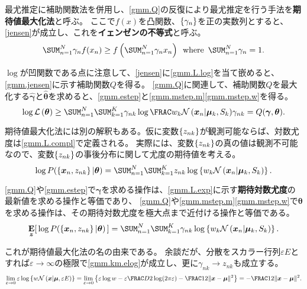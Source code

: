 \documentclass[10pt,a4paper]{book}
\begin{document}
最尤推定に補助関数法を併用し、\eqref{gmm.Q}の反復により最尤推定を行う手法を\textbf{期待値最大化法}と呼ぶ。
ここで$f(x)$を凸関数、$\seq{\gamma_n}$を正の実数列とすると、\eqref{jensen}が成立し、これを\textbf{イェンゼンの不等式}と呼ぶ。
%
\begin{equation}
\label{eq:jensen}
\sum_{n=1}^N \gamma_n f(x_n) \geq f\left(\sum_{n=1}^N \gamma_n x_n\right) \where \sum_{n=1}^N \gamma_n=1.
\end{equation}

$\log$が凹関数である点に注意して、\eqref{jensen}に\eqref{gmm.L.log}を当て嵌めると、\eqref{gmm.jensen}に示す補助関数$Q$を得る。
\eqref{gmm.Q}に関連して、補助関数$Q$を最大化する$\hat{\bm{\gamma}}$と$\hat{\bm{\theta}}$を求めると、\eqref{gmm.estep}と\eqref{gmm.mstep.m}\eqref{gmm.mstep.w}を得る。
%
\begin{equation}
\label{eq:gmm.jensen}
\log \Lk{\bm{\theta}}
\geq \sum_{n=1}^N \sum_{k=1}^K \gamma_{nk} \log \frac{w_k \Nd{\bm{x}_n|\bm{\mu}_k,S_k}}{\gamma_{nk}} = Q(\bm{\gamma}, \bm{\theta}).
\end{equation}

期待値最大化法には別の解釈もある。仮に変数$\seq{z_{nk}}$が観測可能ならば、対数尤度は\eqref{gmm.L.compl}で定義される。
実際には、変数$\seq{z_{nk}}$の真の値は観測不可能なので、変数$\seq{z_{nk}}$の事後分布に関して尤度の期待値を考える。
%
\begin{equation}
\label{eq:gmm.L.compl}
\log P(\seq{\bm{x}_n,z_{nk}}|\bm{\theta}) = \sum_{n=1}^N \sum_{k=1}^K z_{nk} \log \seq{w_k \Nd{\bm{x}_n|\bm{\mu}_k,S_k}}.
\end{equation}

\eqref{gmm.Q}や\eqref{gmm.estep}で$\bm{\gamma}$を求める操作は、\eqref{gmm.L.exp}に示す\textbf{期待対数尤度}の最新値を求める操作と等価であり、
\eqref{gmm.Q}や\eqref{gmm.mstep.m}\eqref{gmm.mstep.w}で$\bm{\theta}$を求める操作は、その期待対数尤度を極大点まで近付ける操作と等価である。
%
\begin{equation}
\label{eq:gmm.L.exp}
\E[\bm{z}]{\log P(\seq{\bm{x}_n,z_{nk}}|\bm{\theta})} = \sum_{n=1}^N \sum_{k=1}^K \gamma_{nk} \log \seq{w_k \Nd{\bm{x}_n|\bm{\mu}_k,S_k}}.
\end{equation}

これが期待値最大化法の名の由来である。
余談だが、分散をスカラー行列$\varepsilon E$とすれば$\varepsilon\!\to\!\infty$の極限で\eqref{gmm.km.elog}が成立し、更に$\gamma_{nk}\!\to\!z_{nk}$も成立する。
%
\begin{equation}
\label{eq:gmm.km.elog}
\lim_{\varepsilon\to0} \varepsilon\log \seq{w \Nd{\bm{x}|\bm{\mu},\varepsilon E}} =
\lim_{\varepsilon\to0} \seq{\varepsilon\log w - \varepsilon\frac{D}{2} \log (2\pi\varepsilon) - \frac{1}{2} \|\bm{x}-\bm{\mu}\|^2} =
-\frac{1}{2} \|\bm{x}-\bm{\mu}\|^2.
\end{equation}
\end{document}

